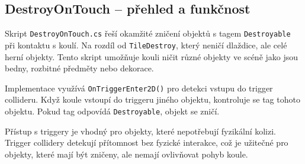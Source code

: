 \subsection{DestroyOnTouch -- přehled a funkčnost}

Skript \texttt{DestroyOnTouch.cs} řeší okamžité zničení objektů s tagem \texttt{Destroyable} při kontaktu s koulí. Na rozdíl od \texttt{TileDestroy}, který neničí dlaždice, ale celé herní objekty. Tento skript umožňuje kouli ničit různé objekty ve scéně jako jsou bedny, rozbitné předměty nebo dekorace.

Implementace využívá \texttt{OnTriggerEnter2D()} pro detekci vstupu do trigger collideru. Když koule vstoupí do triggeru jiného objektu, kontroluje se tag tohoto objektu. Pokud tag odpovídá \texttt{Destroyable}, objekt se zničí.

Přístup s triggery je vhodný pro objekty, které nepotřebují fyzikální kolizi. Trigger collidery detekují přítomnost bez fyzické interakce, což je užitečné pro objekty, které mají být zničeny, ale nemají ovlivňovat pohyb koule.